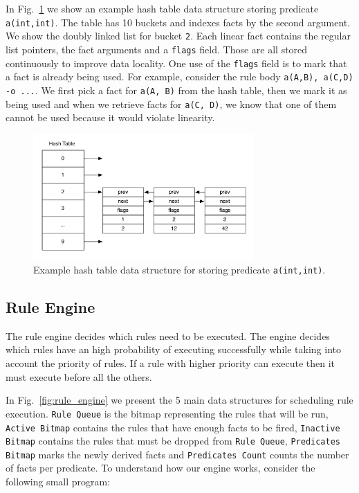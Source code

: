 In Fig.~\ref{fig:hash_table} we show an example hash table data structure storing predicate \texttt{a(int,int)}. The table
has 10 buckets and indexes facts by the second argument. We show the doubly linked list for bucket \texttt{2}. Each linear fact
contains the regular list pointers, the fact arguments and a \texttt{flags} field. Those are all stored continuously to improve data
locality. One use of the \texttt{flags} field is to mark that a fact is already being used. For example,
consider the rule body \texttt{a(A,B), a(C,D) -o ...}. We first pick a fact for \texttt{a(A, B)} from the hash table, then we mark it as
being used and when we retrieve facts for \texttt{a(C, D)}, we know that one of them cannot be used because it would
violate linearity.

\begin{figure}[h]
   \centering
   \includegraphics[width=0.75\textwidth]{hash_table.pdf}
   \caption{Example hash table data structure for storing predicate \texttt{a(int,int)}.}
   \label{fig:hash_table}
\end{figure}

\subsection{Rule Engine}\label{rule_engine}

The rule engine decides which rules need to be executed. The engine decides which rules have
an high probability of executing successfully while taking into account the priority of rules.
If a rule with higher priority can execute then it must execute before all the others. 

In Fig.~\ref{fig:rule_engine} we present the 5 main data structures for scheduling rule execution.
\texttt{Rule Queue} is the bitmap representing the rules that will be run, \texttt{Active Bitmap} contains the rules that have enough
facts to be fired, \texttt{Inactive Bitmap} contains the rules that must be dropped from \texttt{Rule Queue}, \texttt{Predicates Bitmap}
marks the newly derived facts and \texttt{Predicates Count} counts the number of facts per predicate.
To understand how our engine works, consider
the following small program:

